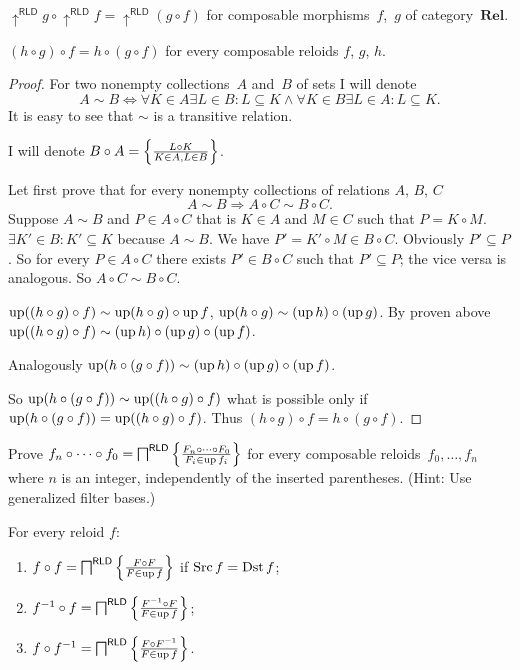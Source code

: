 \begin{obvious}
$\uparrow^{\mathsf{RLD}}g\circ\uparrow^{\mathsf{RLD}}f=\uparrow^{\mathsf{RLD}}(g\circ f)$
for composable morphisms~$f$,~$g$ of category~$\mathbf{Rel}$.\end{obvious}
\begin{thm}
$(h\circ g)\circ f=h\circ(g\circ f)$ for every composable reloids
$f$, $g$, $h$.\end{thm}
\begin{proof}
For two nonempty collections~$A$ and~$B$ of sets I will denote
\[
A\sim B\Leftrightarrow\forall K\in A\exists L\in B:L\subseteq K\wedge\forall K\in B\exists L\in A:L\subseteq K.
\]
It is easy to see that $\sim$ is a transitive relation.

I will denote $B\circ A=\left\{ \frac{L\circ K}{K\in A,L\in B}\right\}$.

Let first prove that for every nonempty collections of relations $A$,
$B$, $C$
\[
A\sim B\Rightarrow A\circ C\sim B\circ C.
\]
Suppose $A\sim B$ and $P\in A\circ C$ that is $K\in A$ and $M\in C$
such that $P=K\circ M$. $\exists K'\in B:K'\subseteq K$ because
$A\sim B$. We have $P'=K'\circ M\in B\circ C$. Obviously $P'\subseteq P$.
So for every $P\in A\circ C$ there exists $P'\in B\circ C$ such
that $P'\subseteq P$; the vice versa is analogous. So $A\circ C\sim B\circ C$.

$\operatorname{up}((h\circ g)\circ f)\sim\operatorname{up}(h\circ g)\circ\operatorname{up} f$, $\operatorname{up}(h\circ g)\sim(\operatorname{up} h)\circ(\operatorname{up} g)$.
By proven above $\operatorname{up}((h\circ g)\circ f)\sim(\operatorname{up} h)\circ(\operatorname{up} g)\circ(\operatorname{up} f)$.

Analogously $\operatorname{up}(h\circ(g\circ f))\sim(\operatorname{up} h)\circ(\operatorname{up} g)\circ(\operatorname{up} f)$.

So $\operatorname{up}(h\circ(g\circ f))\sim\operatorname{up}((h\circ g)\circ f)$ what is possible
only if $\operatorname{up}(h\circ(g\circ f))=\operatorname{up}((h\circ g)\circ f)$. Thus $(h\circ g)\circ f=h\circ(g\circ f)$.\end{proof}
\begin{xca}
Prove $f_n\circ\dots\circ f_0 = \bigsqcap^{\mathsf{RLD}}\left\{ \frac{F_n\circ\dots\circ F_0}{F_i\in\operatorname{up} f_i}\right\}$
for every composable reloids~$f_0,\dots,f_n$ where $n$ is an integer, independently of the inserted parentheses.
(Hint: Use generalized filter bases.)
\end{xca}
\begin{thm}
\label{rld-prod-ff}For every reloid $f$:
\begin{enumerate}
\item \label{rld-ff}$f\circ f=\bigsqcap^{\mathsf{RLD}}\left\{ \frac{F\circ F}{F\in\operatorname{up} f}\right\}$
if $\operatorname{Src} f=\operatorname{Dst} f$;
\item \label{rld-f1f}$f^{-1}\circ f=\bigsqcap^{\mathsf{RLD}}\left\{ \frac{F^{-1}\circ F}{F\in\operatorname{up} f}\right\}$;
\item \label{rld-ff1}$f\circ f^{-1}=\bigsqcap^{\mathsf{RLD}}\left\{ \frac{F\circ F^{-1}}{F\in\operatorname{up} f}\right\}$.
\end{enumerate}
\end{thm}
